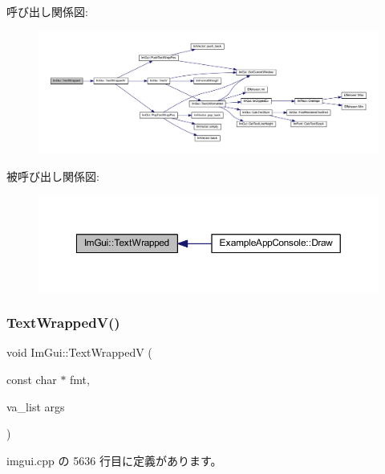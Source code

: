 呼び出し関係図\+:\nopagebreak
\begin{figure}[H]
\begin{center}
\leavevmode
\includegraphics[width=350pt]{namespace_im_gui_ad57bb15c599e73b2ccc7c0f7de6e5823_cgraph}
\end{center}
\end{figure}
被呼び出し関係図\+:\nopagebreak
\begin{figure}[H]
\begin{center}
\leavevmode
\includegraphics[width=350pt]{namespace_im_gui_ad57bb15c599e73b2ccc7c0f7de6e5823_icgraph}
\end{center}
\end{figure}
\mbox{\label{namespace_im_gui_a9019a388cd0c410bcb3d3ae63a008123}} 
\subsubsection{\texorpdfstring{Text\+Wrapped\+V()}{TextWrappedV()}}
{\footnotesize\ttfamily void Im\+Gui\+::\+Text\+WrappedV (\begin{DoxyParamCaption}\item[{const char $\ast$}]{fmt,  }\item[{va\+\_\+list}]{args }\end{DoxyParamCaption})}



 imgui.\+cpp の 5636 行目に定義があります。

